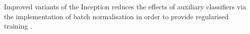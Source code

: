 \documentclass[conference]{IEEEtran}
\begin{document}
Improved variants of the Inception reduces the effects of auxiliary classifiers via the implementation of batch normalisation in order to provide regularised training \cite{Szegedy2015a}.




\end{document}
